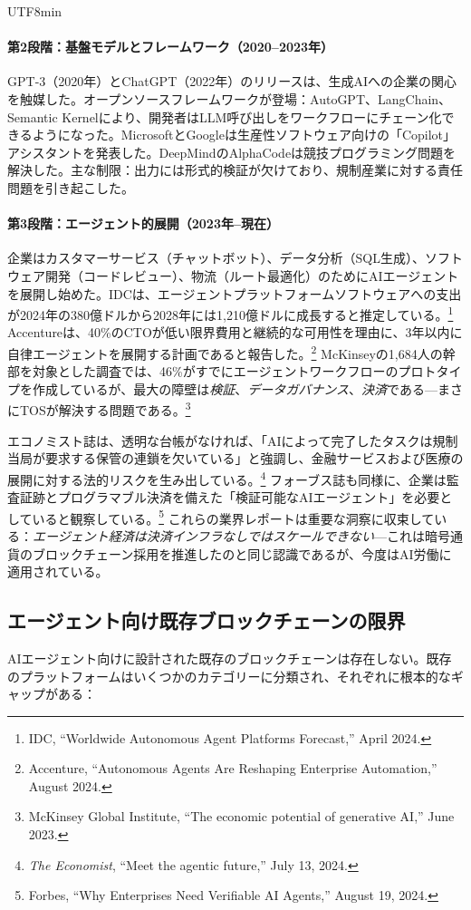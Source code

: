 \documentclass[11pt]{article}
\begin{document}
\begin{CJK}{UTF8}{min}
\paragraph{第2段階：基盤モデルとフレームワーク（2020--2023年）} GPT-3（2020年）とChatGPT（2022年）のリリースは、生成AIへの企業の関心を触媒した。オープンソースフレームワークが登場：AutoGPT、LangChain、Semantic Kernelにより、開発者はLLM呼び出しをワークフローにチェーン化できるようになった。MicrosoftとGoogleは生産性ソフトウェア向けの「Copilot」アシスタントを発表した。DeepMindのAlphaCodeは競技プログラミング問題を解決した。主な制限：出力には形式的検証が欠けており、規制産業に対する責任問題を引き起こした。

\paragraph{第3段階：エージェント的展開（2023年--現在）} 企業はカスタマーサービス（チャットボット）、データ分析（SQL生成）、ソフトウェア開発（コードレビュー）、物流（ルート最適化）のためにAIエージェントを展開し始めた。IDCは、エージェントプラットフォームソフトウェアへの支出が2024年の380億ドルから2028年には1,210億ドルに成長すると推定している。\footnote{IDC, ``Worldwide Autonomous Agent Platforms Forecast,'' April 2024.} Accentureは、40\%のCTOが低い限界費用と継続的な可用性を理由に、3年以内に自律エージェントを展開する計画であると報告した。\footnote{Accenture, ``Autonomous Agents Are Reshaping Enterprise Automation,'' August 2024.} McKinseyの1,684人の幹部を対象とした調査では、46\%がすでにエージェントワークフローのプロトタイプを作成しているが、最大の障壁は\emph{検証}、\emph{データガバナンス}、\emph{決済}である---まさにTOSが解決する問題である。\footnote{McKinsey Global Institute, ``The economic potential of generative AI,'' June 2023.}

エコノミスト誌は、透明な台帳がなければ、「AIによって完了したタスクは規制当局が要求する保管の連鎖を欠いている」と強調し、金融サービスおよび医療の展開に対する法的リスクを生み出している。\footnote{\emph{The Economist}, ``Meet the agentic future,'' July 13, 2024.} フォーブス誌も同様に、企業は監査証跡とプログラマブル決済を備えた「検証可能なAIエージェント」を必要としていると観察している。\footnote{Forbes, ``Why Enterprises Need Verifiable AI Agents,'' August 19, 2024.} これらの業界レポートは重要な洞察に収束している：\emph{エージェント経済は決済インフラなしではスケールできない}---これは暗号通貨のブロックチェーン採用を推進したのと同じ認識であるが、今度はAI労働に適用されている。

\subsection{エージェント向け既存ブロックチェーンの限界}
AIエージェント向けに設計された既存のブロックチェーンは存在しない。既存のプラットフォームはいくつかのカテゴリーに分類され、それぞれに根本的なギャップがある：


\end{CJK}
\end{document}
